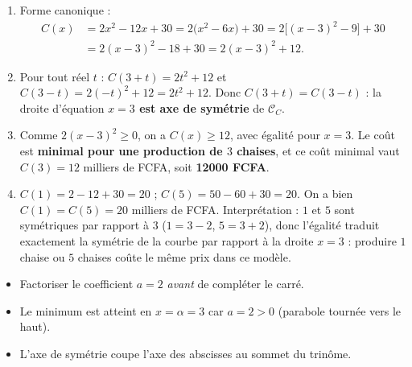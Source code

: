 \documentclass[11pt]{article}
\begin{document}
\begin{corrige}
\begin{enumerate}
    \item Forme canonique :
    \begin{align*}
    C(x)&=2x^2-12x+30=2\big(x^2-6x\big)+30=2\big[(x-3)^2-9\big]+30\\
    &=2(x-3)^2-18+30=2(x-3)^2+12.
    \end{align*}
    \item Pour tout réel $t$ : $C(3+t)=2t^2+12$ et $C(3-t)=2(-t)^2+12=2t^2+12$.
    Donc $C(3+t)=C(3-t)$ : la droite d'équation \textbf{$x=3$ est axe de symétrie} de $\mathcal{C}_C$.
    \item Comme $2(x-3)^2\ge 0$, on a $C(x)\ge 12$, avec égalité pour $x=3$.
    Le coût est \textbf{minimal pour une production de $3$ chaises}, et ce coût minimal vaut $C(3)=12$ milliers de FCFA, soit \textbf{\num{12000} FCFA}.
    \item $C(1)=2-12+30=20$ ; $C(5)=50-60+30=20$. On a bien $C(1)=C(5)=20$ milliers de FCFA.
    Interprétation : $1$ et $5$ sont symétriques par rapport à $3$ ($1=3-2$, $5=3+2$), donc l'égalité traduit exactement la symétrie de la courbe par rapport à la droite $x=3$ : produire $1$ chaise ou $5$ chaises coûte le même prix dans ce modèle.
\end{enumerate}
\begin{attention}
\begin{itemize}
    \item Factoriser le coefficient $a=2$ \emph{avant} de compléter le carré.
    \item Le minimum est atteint en $x=\alpha=3$ car $a=2>0$ (parabole tournée vers le haut).
    \item L'axe de symétrie coupe l'axe des abscisses au sommet du trinôme.
\end{itemize}
\end{attention}
\end{corrige}
\end{document}
